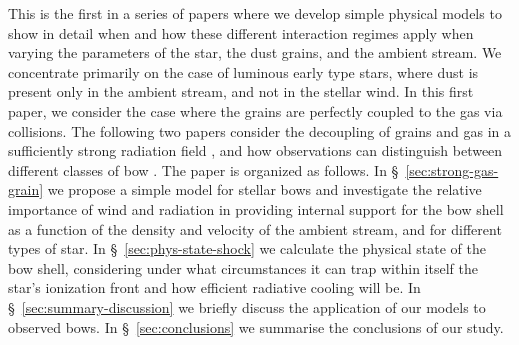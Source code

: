 

This is the first in a series of papers where we develop simple
physical models to show in detail when and how these different
interaction regimes apply when varying the parameters of the star, the
dust grains, and the ambient stream.  We concentrate primarily on the
case of luminous early type stars, where dust is present only in the
ambient stream, and not in the stellar wind.  In this first paper, we
consider the case where the grains are perfectly coupled to the gas
via collisions.  The following two papers consider the decoupling of
grains and gas in a sufficiently strong radiation field
\citep[Paper~II]{Henney:2019b}, and how observations can distinguish
between different classes of bow \citep[Paper~III]{Henney:2019c}.
%
The paper is organized as follows.
%
In \S~\ref{sec:strong-gas-grain} we propose a simple model for stellar
bows and investigate the relative importance of wind and radiation in
providing internal support for the bow shell as a function of the
density and velocity of the ambient stream, and for different types of
star.  In \S~\ref{sec:phys-state-shock} we calculate the physical
state of the bow shell, considering under what circumstances it can
trap within itself the star's ionization front and how efficient
radiative cooling will be.
%
In \S~\ref{sec:summary-discussion} we briefly discuss the application
of our models to observed bows.
%
In \S~\ref{sec:conclusions} we summarise the conclusions of our study. 
%








